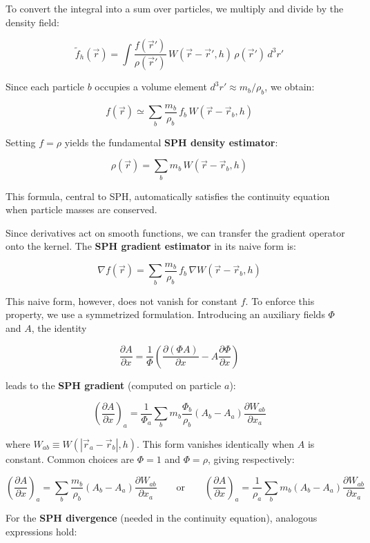 \medskip

To convert the integral into a sum over particles, we multiply and divide by the density field:

$$
\tilde{f}_h(\vec{r}) = \int \frac{f(\vec{r}')}{\rho(\vec{r}')} \, W(\vec{r} - \vec{r}', h) \, \rho(\vec{r}') \, d^3r'
$$

Since each particle $b$ occupies a volume element $d^3r' \approx m_b / \rho_b$, we obtain:

$$
f(\vec{r}) \simeq \sum_b \frac{m_b}{\rho_b} \, f_b \, W(\vec{r} - \vec{r}_b, h)
$$

Setting $f = \rho$ yields the fundamental \textbf{SPH density estimator}:

$$
\boxed{\rho(\vec{r}) = \sum_b m_b \, W(\vec{r} - \vec{r}_b, h)}
$$

This formula, central to SPH, automatically satisfies the continuity equation when particle masses are conserved.

Since derivatives act on smooth functions, we can transfer the gradient operator onto the kernel. The \textbf{SPH gradient estimator} in its naive form is:

$$
\nabla f(\vec{r}) = \sum_b \frac{m_b}{\rho_b} \, f_b \, \nabla W(\vec{r} - \vec{r}_b, h)
$$

This naive form, however, does not vanish for constant $f$. To enforce this property, we use a symmetrized formulation. Introducing an auxiliary fields $\Phi$ and $A$, the identity

$$
\frac{\partial A}{\partial x} = \frac{1}{\Phi} \left( \frac{\partial (\Phi A)}{\partial x} - A \frac{\partial \Phi}{\partial x} \right)
$$

leads to the \textbf{SPH gradient} (computed on particle $a$):

$$
\left( \frac{\partial A}{\partial x} \right)_a = \frac{1}{\Phi_a} \sum_b m_b \frac{\Phi_b}{\rho_b} (A_b - A_a) \frac{\partial W_{ab}}{\partial x_a}
$$

where $W_{ab} \equiv W(|\vec{r}_a - \vec{r}_b|, h)$. This form vanishes identically when $A$ is constant. Common choices are $\Phi = 1$ and $\Phi = \rho$, giving respectively:

$$
\left( \frac{\partial A}{\partial x} \right)_a = \sum_b \frac{m_b}{\rho_b} (A_b - A_a) \frac{\partial W_{ab}}{\partial x_a}
\qquad \text{or} \qquad
\left( \frac{\partial A}{\partial x} \right)_a = \frac{1}{\rho_a} \sum_b m_b (A_b - A_a) \frac{\partial W_{ab}}{\partial x_a}
$$

For the \textbf{SPH divergence} (needed in the continuity equation), analogous expressions hold:

